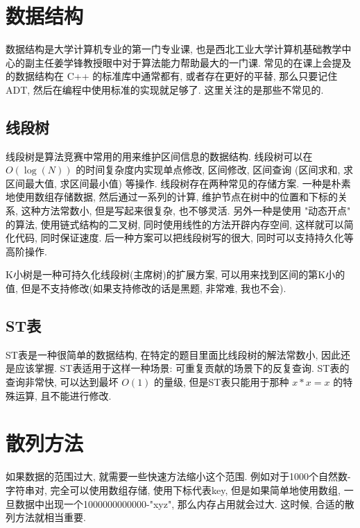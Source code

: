 \documentclass[a4paper]{ctexart}
\begin{document}
\section{数据结构}

数据结构是大学计算机专业的第一门专业课, 也是西北工业大学计算机基础教学中心的副主任姜学锋教授眼中对于算法能力帮助最大的一门课. 常见的在课上会提及的数据结构在 C++ 的标准库中通常都有, 或者存在更好的平替, 那么只要记住 ADT, 然后在编程中使用标准的实现就足够了. 这里关注的是那些不常见的.

\subsection{线段树}

线段树是算法竞赛中常用的用来维护区间信息的数据结构. 线段树可以在 $O(\log(N))$ 的时间复杂度内实现单点修改, 区间修改, 区间查询 (区间求和, 求区间最大值, 求区间最小值) 等操作. 线段树存在两种常见的存储方案. 一种是朴素地使用数组存储数据, 然后通过一系列的计算, 维护节点在树中的位置和下标的关系, 这种方法常数小, 但是写起来很复杂, 也不够灵活. 另外一种是使用 "动态开点" 的算法, 使用链式结构的二叉树, 同时使用线性的方法开辟内存空间, 这样就可以简化代码, 同时保证速度. 后一种方案可以把线段树写的很大, 同时可以支持持久化等高阶操作.

K小树是一种可持久化线段树(主席树)的扩展方案, 可以用来找到区间的第K小的值, 但是不支持修改(如果支持修改的话是黑题, 非常难, 我也不会).



\subsection{ST表}

ST表是一种很简单的数据结构, 在特定的题目里面比线段树的解法常数小, 因此还是应该掌握. ST表适用于这样一种场景: 可重复贡献的场景下的反复查询. ST表的查询非常快, 可以达到最坏 $O(1)$ 的量级, 但是ST表只能用于那种 $x*x=x$ 的特殊运算, 且不能进行修改.



\section{散列方法}

如果数据的范围过大, 就需要一些快速方法缩小这个范围. 例如对于1000个自然数-字符串对, 完全可以使用数组存储, 使用下标代表key, 但是如果简单地使用数组, 一旦数据中出现一个1000000000000-"xyz", 那么内存占用就会过大. 这时候, 合适的散列方法就相当重要.
\end{document}
